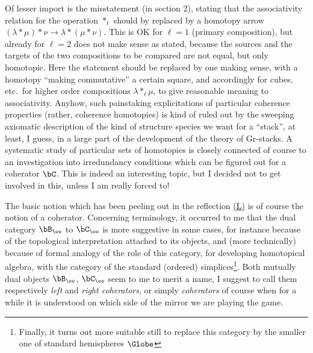 Of lesser import is the misstatement (in section 2),
stating that the associativity relation for the operation $*_\ell$
should by replaced by a homotopy arrow
$(\lambda * \mu) * \nu \to \lambda * (\mu * \nu)$. This is OK for
$\ell=1$ (primary composition), but already for $\ell=2$ does not make
sense as stated, because the sources and the targets of the two compositions to be compared are not equal, but only homotopic. Here the
statement should be replaced by one making sense, with a homotopy
``making commutative'' a certain square, and accordingly for cubes,
etc.\ for higher order compositions $\lambda *_\ell \mu$, to give
reasonable meaning to associativity. Anyhow, such painstaking
explicitations of particular coherence properties (rather, coherence
homotopies) is kind of ruled out by the sweeping axiomatic description
of the kind of structure species we want for a ``stack'', at least, I
guess, in a large part of the development of the theory of
Gr-stacks. A systematic study of particular sets of homotopies is
closely connected of course to an investigation into irredundancy
conditions which can be figured out for a coherator $\bC$. This is
indeed an interesting topic, but I decided not to get involved in
this, unless I am really forced to!

The basic notion which has been peeling out in the reflection \hyperref[ch:I]{(L)} is
of course the notion of a coherator. Concerning terminology, it
occurred to me that the dual category $\bB_\oo$ to $\bC_\oo$ is
more suggestive in some cases, for instance because of the topological
interpretation attached to its objects, and (more technically) because
of formal analogy of the role of this category, for developing
homotopical algebra, with the category of the standard (ordered)
simplices\footnote{Finally, it turns out more suitable still to replace this category by the smaller one of standard hemispheres $\Globe$}. Both mutually dual objects $\bB_\oo$, $\bC_\oo$ seem
to me to merit a name, I suggest to call them respectively \emph{left}
and \emph{right coherators}, or simply \emph{coherators} of course
when for a while it is understood on which side of the mirror we are
playing the game.


